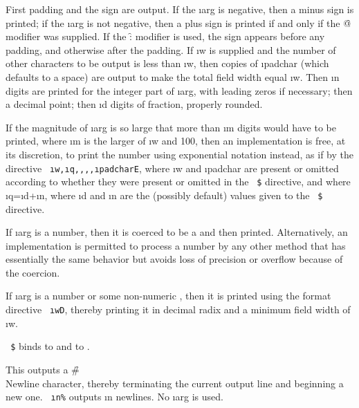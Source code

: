 First padding and the sign are output.
If the \i{arg} is negative, then a minus sign is printed;
if the \i{arg} is not negative, then a plus sign is printed
if and only if the \f{@} modifier was supplied.  
If the \f{:} modifier is used, the sign appears before any padding,
and otherwise after the padding.
If \i{w} is supplied and the number of other characters to be output
is less than \i{w}, then copies of \i{padchar} (which defaults
to a space) are output to
make the total field width equal \i{w}.
Then \i{n} digits are printed for the integer part of \i{arg},
with leading zeros if necessary; then a decimal point;
then \i{d} digits of fraction, properly rounded.

If the magnitude of \i{arg} is so large that more than \i{m} digits would
have to be printed, where \i{m} is the larger of \i{w} and 100, then an
implementation is free, at its discretion, to print the number using
exponential notation instead, as if by the directive
{\tt ~\i{w},\i{q},,,,\i{padchar}E}, where \i{w} and \i{padchar} are
present or omitted according to whether they were present or omitted in
the {\tt ~\$} directive, and where \i{q}=\i{d}+\i{n},
where \i{d} and \i{n} are the (possibly default) values given to the
{\tt ~\$} directive.

If \i{arg} is a  
number, then it is coerced to be a 
and then printed.  Alternatively, an implementation is permitted to
process a  number by any 
other method that has essentially the
same behavior but avoids loss of precision or overflow
because of the coercion.

If \i{arg} is a  number or some non-numeric
,
then it is printed using the format directive {\tt ~\i{w}D},
thereby printing it in decimal radix and a minimum field width of \i{w}.

{\tt ~\$} binds  to 
 and  to .


\itemitem{\f{~\%}}

This outputs a \f{\#\\Newline} character, thereby terminating the current
output line and beginning a new one.
{\tt ~\i{n}\%} outputs \i{n} newlines.
No \i{arg} is used.  

